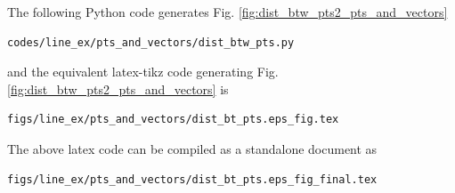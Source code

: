 \begin{enumerate}
\solution The  following Python code generates Fig. \ref{fig:dist_btw_pts2_pts_and_vectors}

\begin{lstlisting}
codes/line_ex/pts_and_vectors/dist_btw_pts.py
\end{lstlisting}

and the equivalent latex-tikz code generating Fig. \ref{fig:dist_btw_pts2_pts_and_vectors} is 
\begin{lstlisting}
figs/line_ex/pts_and_vectors/dist_bt_pts.eps_fig.tex
\end{lstlisting}
%
The above latex code can be compiled as a standalone document as
\begin{lstlisting}
figs/line_ex/pts_and_vectors/dist_bt_pts.eps_fig_final.tex
\end{lstlisting}
\end{enumerate}


